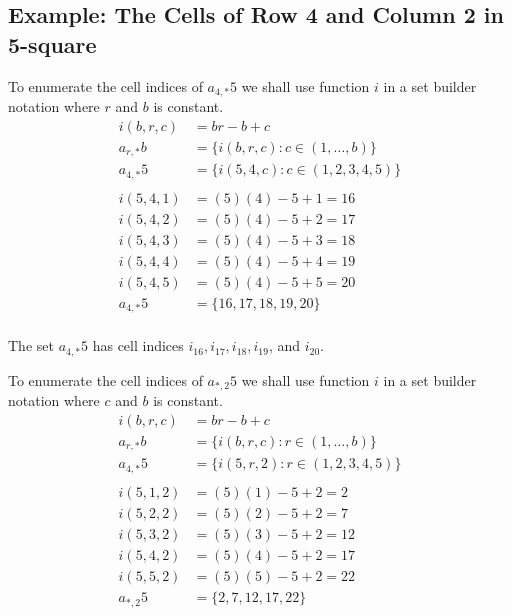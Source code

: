 \documentclass[letterpaper, twoside,12pt]{article}
\begin{document}
    \subsection{Example: The Cells of Row 4 and Column 2 in 5-square} \label{2_example_1}
    To enumerate the cell indices of $a_{4,*}5$ we shall use function $i$ in a set builder notation where $r$ and $b$ is constant.
    \begin{equation*}
        \begin{split}
            i(b,r,c) &= br - b + c \\
            a_{r,*}b &= \{ i(b,r,c) : c \in (1, \dots, b) \} \\
            a_{4,*}5 &= \{ i(5,4,c) : c \in (1,2,3,4,5) \} \\
            \\
            i(5,4,1) &= (5)(4) - 5 + 1 = 16 \\
            i(5,4,2) &= (5)(4) - 5 + 2 = 17 \\
            i(5,4,3) &= (5)(4) - 5 + 3 = 18 \\
            i(5,4,4) &= (5)(4) - 5 + 4 = 19 \\
            i(5,4,5) &= (5)(4) - 5 + 5 = 20 \\
            a_{4,*}5 &= \{16, 17, 18, 19, 20 \} \\
        \end{split}
    \end{equation*}

    The set $a_{4,*}5$ has cell indices $i_{16}, i_{17}, i_{18}, i_{19}$, and $i_{20}$.

    To enumerate the cell indices of $a_{*,2}5$ we shall use function $i$ in a set builder notation where $c$ and $b$ is constant.
    \begin{equation*}
        \begin{split}
            i(b,r,c) &= br - b + c \\
            a_{r,*}b &= \{ i(b,r,c) : r \in (1, \dots, b) \} \\
            a_{4,*}5 &= \{ i(5,r,2) : r \in (1,2,3,4,5) \} \\
            \\
            i(5,1,2) &= (5)(1) - 5 + 2 = 2 \\
            i(5,2,2) &= (5)(2) - 5 + 2 = 7 \\
            i(5,3,2) &= (5)(3) - 5 + 2 = 12 \\
            i(5,4,2) &= (5)(4) - 5 + 2 = 17 \\
            i(5,5,2) &= (5)(5) - 5 + 2 = 22 \\
            a_{*,2}5 &= \{2, 7, 12, 17, 22 \} \\
        \end{split}
    \end{equation*}
\end{document}
